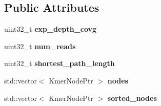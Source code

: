 \subsection*{Public Attributes}
\begin{DoxyCompactItemize}
\item 
\mbox{\label{classKmerGraph_a915de8efc420f7a6232417e7fa05c757}} 
uint32\+\_\+t {\bfseries exp\+\_\+depth\+\_\+covg}
\item 
\mbox{\label{classKmerGraph_a1507551fda3370e4cd035867490cb630}} 
uint32\+\_\+t {\bfseries num\+\_\+reads}
\item 
\mbox{\label{classKmerGraph_a796a7736406528a56da4b0c20ba462be}} 
uint32\+\_\+t {\bfseries shortest\+\_\+path\+\_\+length}
\item 
\mbox{\label{classKmerGraph_a70a7b81838a6166366d5c9619933be43}} 
std\+::vector$<$ Kmer\+Node\+Ptr $>$ {\bfseries nodes}
\item 
\mbox{\label{classKmerGraph_af727fcd1fdb67ee1a4253fb6fa930743}} 
std\+::vector$<$ Kmer\+Node\+Ptr $>$ {\bfseries sorted\+\_\+nodes}
\end{DoxyCompactItemize}
